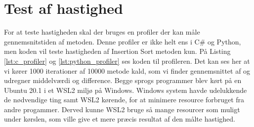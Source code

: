 \documentclass[class=report, crop=false]{standalone}
\begin{document}
    \section{Test af hastighed}
    For at teste hastigheden skal der bruges en profiler der kan måle gennemsnitstiden af metoden. Denne profiler er ikke helt ens i C\# og Python, men koden vil teste hastigheden af Insertion Sort metoden kun. På Listing \ref{lst:c_profiler} og \ref{lst:python_profiler} ses koden til profileren. Det kan ses her at vi kører 1000 iterationer af 10000 metode kald, som vi finder gennemsnittet af og udregner middelværdi og difference.
    Begge sprogs programmer blev kørt på en Ubuntu 20.1 i et WSL2 miljø på Windows. Windows system havde udelukkende de nødvendige ting samt WSL2 kørende, for at minimere resource forbruget fra andre progammer. Derved kunne WSL2 bruge så mange resourcer som muligt under kørslen, som ville give et mere præcis resultat af den målte hastighed.
    \begin{tcolorbox}
        \lstset{style=codestyle}
        C}, lastline=22, caption={C\# Profiler}, label={lst:c_profiler}]{Kode/Profiler.cs}
    \end{tcolorbox}
    \begin{tcolorbox}
        \lstset{style=codestyle}
        
    \end{tcolorbox}
\end{document}
